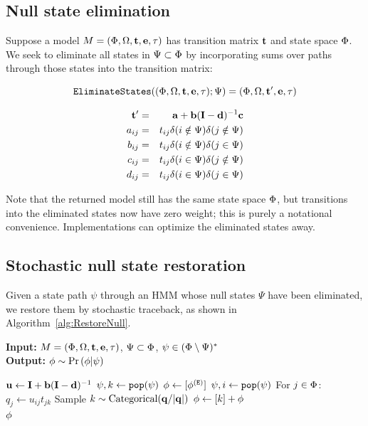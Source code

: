 \documentclass{article}
\newcommand\prob[1]{\mbox{Pr}\left( #1 \right)}
\newcommand\seclabel[1]{\label{sec:#1}}
\newcommand\secref[1]{Section~\ref{sec:#1}}
\newcommand\alglabel[1]{\label{alg:#1}}
\newcommand\algoref[1]{Algorithm~\ref{alg:#1}}
\newcommand\algrequire[1]{\textbf{Input:} #1 \\}
\newcommand\algensure[1]{\textbf{Output:} #1 \\}
\begin{document}
\subsection{Null state elimination}
\seclabel{NullStateElimination}

Suppose a model
$M=(\Phi,\Omega,{\bf t},{\bf e},\tau)$
has transition matrix ${\bf t}$ and state space $\Phi$.
We seek to eliminate all states in $\Psi \subset \Phi$
by incorporating sums over paths through those states into the transition matrix:

\[
{\tt EliminateStates}((\Phi,\Omega,{\bf t},{\bf e},\tau);\Psi)
=
(\Phi,\Omega,{\bf t}',{\bf e},\tau)
\]

\begin{eqnarray*}
{\bf t}' & = & {\bf a} + {\bf b}({\bf I}-{\bf d})^{-1}{\bf c} \\
a_{ij} & = & t_{ij} \delta(i \notin \Psi)\delta(j \notin \Psi) \\
b_{ij} & = & t_{ij} \delta(i \notin \Psi)\delta(j \in \Psi) \\
c_{ij} & = & t_{ij} \delta(i \in \Psi)\delta(j \notin \Psi) \\
d_{ij} & = & t_{ij} \delta(i \in \Psi)\delta(j \in \Psi) 
\end{eqnarray*}

Note that the returned model still has the same state space $\Phi$, but transitions
into the eliminated states now have zero weight; this is purely a notational convenience.
Implementations can optimize the eliminated states away.

\subsection{Stochastic null state restoration}
\seclabel{hmmrestore}

Given a state path $\psi$ through an HMM whose null states $\Psi$ have been eliminated,
we restore them by stochastic traceback, as shown in \algoref{RestoreNull}.

\begin{algorithm}
\caption{$\restorestates(M,\Psi,\psi)$}
\alglabel{RestoreNull}
\algrequire{$M=(\Phi,\Omega,{\bf t},{\bf e},\tau)$, $\Psi \subset \Phi$, $\psi \in (\Phi \setminus \Psi)^\ast$}
\algensure{$\statepath \sim \prob{\statepath|\psi}$}
\begin{algorithmic}
\State ${\bf u} \gets {\bf I} + {\bf b}({\bf I} - {\bf d})^{-1}$
\Comment{${\bf b}$,${\bf d}$ defined in \secref{NullStateElimination}}
\State $\psi, k \gets {\tt pop}(\psi)$ 
\State $\phi \gets [\phi^{({\tt E})}]$
\Repeat
  \State $\psi, i \gets {\tt pop}(\psi)$
  \Repeat
    \State For $j \in \Phi$: $q_j \gets u_{ij} t_{jk}$
    \State Sample $k \sim \mbox{Categorical}({\bf q} / |{\bf q}|)$
    \State $\phi \gets [k] + \phi$
\\
\Return $\phi$
\end{algorithmic}
\end{algorithm}
\end{document}
